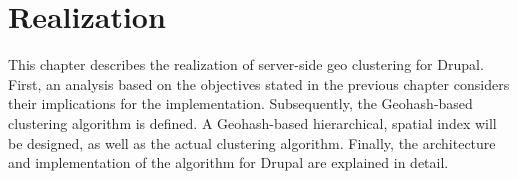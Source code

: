 
%
%

\chapter{Realization}
\label{chapter:realization}

This chapter describes the realization of server-side geo clustering for Drupal. First, an analysis based on the objectives stated in the previous chapter considers their implications for the implementation. Subsequently, the Geohash-based clustering algorithm is defined. A Geohash-based hierarchical, spatial index will be designed, as well as the actual clustering algorithm. Finally, the architecture and implementation of the algorithm for Drupal are explained in detail.




	
